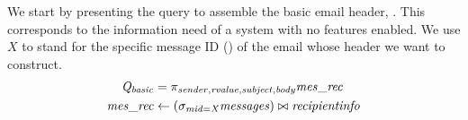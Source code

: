 We start by presenting the query to assemble the basic email header, \Qbasic.
This corresponds to the information need of a system with no features enabled.
We use $X$ to stand for the specific message ID (\midatt) of the email whose
header we want to construct.
%
\vspace{-2pt}
\begin{align*}
\Qbasic &= 
\projectRel{\sender,\rvalue,\subject,\body} \mrtable \\
\mrtable &\leftarrow (\selectRel\midCond\messages) \bowtie \recipientinfo
\end{align*}
\vspace{-13pt}
%


